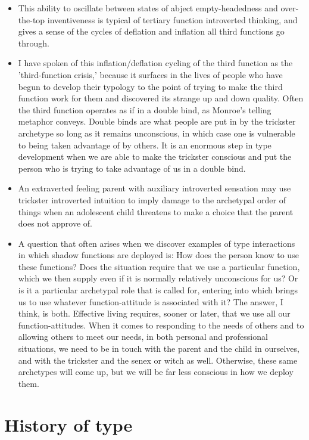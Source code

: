 \begin{itemize}
\item This ability to oscillate between states of abject empty-headedness and
over-the-top inventiveness is typical of tertiary function introverted
thinking, and gives a sense of the cycles of deflation and inflation all third
functions go through.

\item I have spoken of this inflation/deflation cycling of the third function
as the 'third-function crisis,' because it surfaces in the lives of people who
have begun to develop their typology to the point of trying to make the third
function work for them and discovered its strange up and down quality. Often
the third function operates as if in a double bind, as Monroe's telling
metaphor conveys. Double binds are what people are put in by the trickster
archetype so long as it remains unconscious, in which case one is vulnerable to
being taken advantage of by others. It is an enormous step in type development
when we are able to make the trickster conscious and put the person who is
trying to take advantage of us in a double bind.

\item An extraverted feeling parent with auxiliary introverted sensation may
use trickster introverted intuition to imply damage to the archetypal order of
things when an adolescent child threatens to make a choice that the parent does
not approve of.

\item A question that often arises when we discover examples of type
interactions in which shadow functions are deployed is: How does the person
know to use these functions? Does the situation require that we use a
particular function, which we then supply even if it is normally relatively
unconscious for us? Or is it a particular archetypal role that is called for,
entering into which brings us to use whatever function-attitude is associated
with it? The answer, I think, is both. Effective living requires, sooner or
later, that we use all our function-attitudes. When it comes to responding to
the needs of others and to allowing others to meet our needs, in both personal
and professional situations, we need to be in touch with the parent and the
child in ourselves, and with the trickster and the senex or witch as well.
Otherwise, these same archetypes will come up, but we will be far less
conscious in how we deploy them.

\end{itemize}

\section{History of type}

